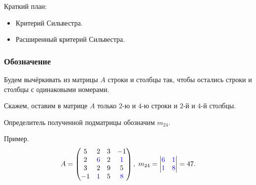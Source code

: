 
\begin{frame} %


\end{frame}



\begin{frame}{Краткий план:}
  \begin{itemize}[<+->]
    \item Критерий Сильвестра.
    \item Расширенный критерий Сильвестра.
  \end{itemize}

\end{frame}


\begin{frame}
    \frametitle{Обозначение}

    Будем вычёркивать из матрицы $A$ строки и столбцы так, чтобы остались строки и столбцы с одинаковыми номерами.\pause

    Скажем, оставим в матрице $A$ только $2$-ю и $4$-ю строки и 
    $2$-й и $4$-й столбцы. \pause

    Определитель полученной подматрицы обозначим $m_{24}$. \pause

    Пример. 
    \[
    A = \begin{pmatrix}
        5 & 2 & 3 & -1 \\
        2 & \textcolor{blue}{6} & 2 & \textcolor{blue}{1} \\
        3 & 2 & 9 & 5 \\
        -1 & \textcolor{blue}{1} & 5 & \textcolor{blue}{8} \\
    \end{pmatrix}, \; m_{24} = \begin{vmatrix}
        \textcolor{blue}{6} & \textcolor{blue}{1} \\
        \textcolor{blue}{1} & \textcolor{blue}{8} \\
    \end{vmatrix} = 47.
    \]
    
\end{frame}


